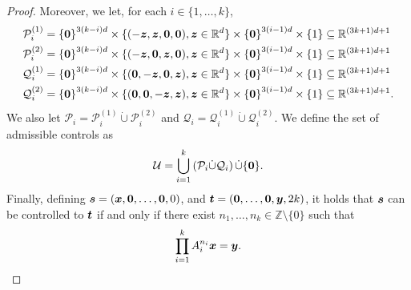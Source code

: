 \begin{proof}
Moreover, we let, for each $i \in \lbrace 1, \ldots, k \rbrace$,
\begin{align*}
\mathcal{P}_{i}^{(1)} = {\lbrace \boldsymbol{0} \rbrace}^{3(k-i)d} \times
\lbrace (-\boldsymbol{z}, \boldsymbol{z}, \boldsymbol{0}, \boldsymbol{0}), \boldsymbol{z} \in \mathbb{R}^{d} \rbrace \times
{\lbrace \boldsymbol{0} \rbrace}^{3(i-1)d} &\times \lbrace 1 \rbrace
\subseteq \mathbb{R}^{(3k+1)d+1} \\
\mathcal{P}_{i}^{(2)} = {\lbrace \boldsymbol{0} \rbrace}^{3(k-i)d} \times
\lbrace (-\boldsymbol{z}, \boldsymbol{0}, \boldsymbol{z}, \boldsymbol{0}), \boldsymbol{z} \in \mathbb{R}^{d} \rbrace \times
{\lbrace \boldsymbol{0} \rbrace}^{3(i-1)d} &\times \lbrace 1 \rbrace
\subseteq \mathbb{R}^{(3k+1)d+1} \\
\mathcal{Q}_{i}^{(1)} = {\lbrace \boldsymbol{0} \rbrace}^{3(k-i)d} \times
\lbrace (\boldsymbol{0}, -\boldsymbol{z}, \boldsymbol{0}, \boldsymbol{z}), \boldsymbol{z} \in \mathbb{R}^{d} \rbrace \times
{\lbrace \boldsymbol{0} \rbrace}^{3(i-1)d} &\times \lbrace 1 \rbrace
\subseteq \mathbb{R}^{(3k+1)d+1} \\
\mathcal{Q}_{i}^{(2)} = {\lbrace \boldsymbol{0} \rbrace}^{3(k-i)d} \times
\lbrace (\boldsymbol{0}, \boldsymbol{0}, -\boldsymbol{z}, \boldsymbol{z}), \boldsymbol{z} \in \mathbb{R}^{d} \rbrace \times
{\lbrace \boldsymbol{0} \rbrace}^{3(i-1)d} &\times \lbrace 1 \rbrace
\subseteq \mathbb{R}^{(3k+1)d+1}.
\end{align*}
We also let $\mathcal{P}_{i} = \mathcal{P}_{i}^{(1)} \dot{\cup} \mathcal{P}_{i}^{(2)}$ and $\mathcal{Q}_{i} = \mathcal{Q}_{i}^{(1)} \dot{\cup} \mathcal{Q}_{i}^{(2)}$.
We define the set of admissible controls as
\begin{align*}
\mathcal{U} = \bigcup\limits_{i=1}^{k} \left( \mathcal{P}_{i} \dot{\cup} \mathcal{Q}_{i} \right) \dot{\cup} \lbrace \boldsymbol{0} \rbrace.
\end{align*}
Finally, defining $\boldsymbol{s} = (\boldsymbol{x}, \boldsymbol{0}, \ldots, \boldsymbol{0}, 0)$, and $\boldsymbol{t} = (\boldsymbol{0}, \ldots, \boldsymbol{0}, \boldsymbol{y}, 2k)$, it holds that $\boldsymbol{s}$ can be controlled to $\boldsymbol{t}$ if and only if there exist $n_{1}, \ldots, n_{k} \in \mathbb{Z} \setminus \lbrace 0 \rbrace$ such that
\begin{equation*}
\prod\limits_{i=1}^{k}A_{i}^{n_{i}} \boldsymbol{x} = \boldsymbol{y}.
\end{equation*}


\end{proof}
